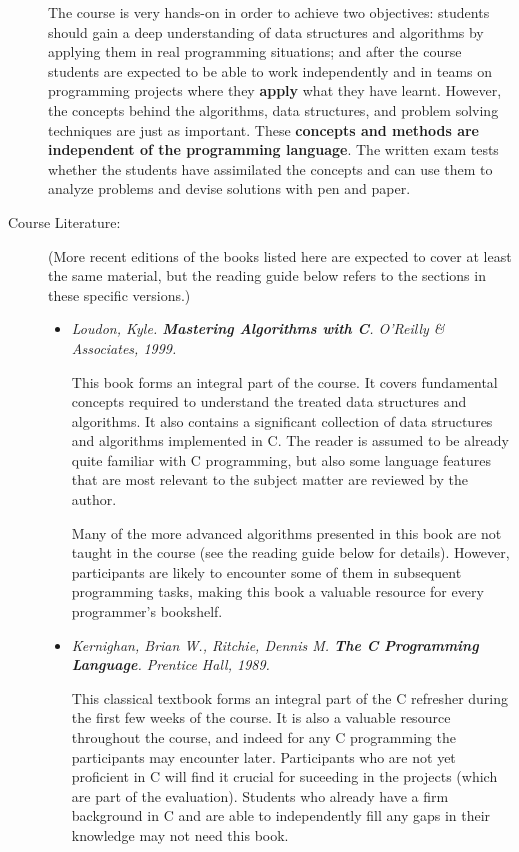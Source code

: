 \documentclass[a4paper]{article}
\begin{document}
\begin{description}
  The course is very hands-on in order to achieve two objectives:
  students should gain a deep understanding of data structures and algorithms by applying them in real programming situations;
  and after the course students are expected to be able to work independently and in teams on programming projects where they \textbf{apply} what they have learnt.
  However, the concepts behind the algorithms, data structures, and problem solving techniques are just as important.
  These \textbf{concepts and methods are independent of the programming language}.
  The written exam tests whether the students have assimilated the concepts and can use them to analyze problems and devise solutions with pen and paper.
  
\item[Course Literature:]
  (More recent editions of the books listed here are expected to cover at least the same material, but the reading guide below refers to the sections in these specific versions.)
  
  \begin{itemize}
    
  \item \emph{
    Loudon, Kyle. \textbf{Mastering Algorithms with C}. O'Reilly \& Associates, 1999.
  }
    
  This book forms an integral part of the course.
  It covers fundamental concepts required to understand the treated data structures and algorithms.
  It also contains a significant collection of data structures and algorithms implemented in C.
  The reader is assumed to be already quite familiar with C programming, but also some language features that are most relevant to the subject matter are reviewed by the author.
  
  Many of the more advanced algorithms presented in this book are not taught in the course (see the reading guide below for details).
  However, participants are likely to encounter some of them in subsequent programming tasks, making this book a valuable resource for every programmer's bookshelf.
  
  \item
    \emph{
      Kernighan, Brian W., Ritchie, Dennis M. \textbf{The C Programming Language}. Prentice Hall, 1989.
    }
    
    This classical textbook forms an integral part of the C refresher during the first few weeks of the course.
    It is also a valuable resource throughout the course, and indeed for any C programming the participants may encounter later.
    Participants who are not yet proficient in C will find it crucial for suceeding in the projects (which are part of the evaluation).
    Students who already have a firm background in C and are able to independently fill any gaps in their knowledge may not need this book.
    
  \end{itemize}
  
\end{description}
\end{document}
